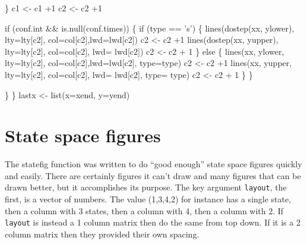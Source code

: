 \documentclass{article}
\newcommand{\code}[1]{\texttt{#1}}
\begin{document}
\begin{nwchunk}
         \}
         c1 <- c1 +1
         c2 <- c2 +1
 
         if (conf.int && is.null(conf.times)) \{
             if (type == 's') \{
                 lines(dostep(xx, ylower), lty=lty[c2], 
                       col=col[c2],lwd=lwd[c2])
                 c2 <- c2 +1
                 lines(dostep(xx, yupper), lty=lty[c2], 
                       col=col[c2], lwd= lwd[c2])
                 c2 <- c2 + 1
             \}
             else \{
                 lines(xx, ylower, lty=lty[c2], 
                       col=col[c2],lwd=lwd[c2], type=type) 
                 c2 <- c2 +1
                 lines(xx, yupper, lty=lty[c2], 
                       col=col[c2], lwd= lwd[c2], type= type)
                 c2 <- c2 + 1
             \}
          \}
 
     \}
 \}
 lastx <- list(x=xend, y=yend)
\end{nwchunk}




\section{State space figures}
The statefig function was written to do ``good enough'' state space figures
quickly and easily.  There are certainly figures it can't draw and
many figures that can be drawn better, but it accomplishes its purpose.
The key argument \code{layout}, the first, is a vector of numbers.
The value (1,3,4,2) for instance has a single state, then a column with 3
states, then a column with 4, then a column with 2. 
If \code{layout} is instead a 1 column matrix then do the same from top
down.  If it is a 2 column matrix then they provided their own spacing.
\end{document}

